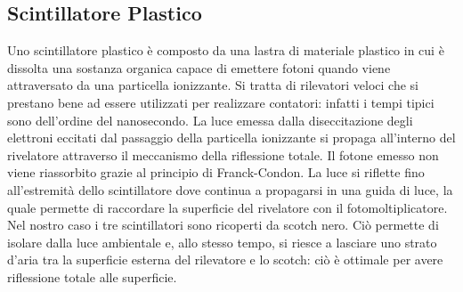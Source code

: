 \documentclass[a4paper,10pt]{article}
\begin{document}
\label{sec:apparato} 

\subsection{Scintillatore Plastico}
Uno scintillatore plastico è composto da una lastra di materiale plastico in cui è dissolta una sostanza organica capace di emettere fotoni quando viene attraversato da una particella ionizzante. Si tratta di rilevatori veloci che si prestano bene ad essere utilizzati per realizzare contatori: infatti i tempi tipici sono dell'ordine del nanosecondo. La luce emessa dalla diseccitazione degli elettroni eccitati dal passaggio della particella ionizzante si propaga all'interno del rivelatore attraverso il meccanismo della riflessione totale. Il fotone emesso non viene riassorbito grazie al principio di Franck-Condon. La luce si riflette fino all'estremità dello scintillatore dove continua a propagarsi in una guida di luce, la quale permette di raccordare la superficie del rivelatore con il fotomoltiplicatore. \\
Nel nostro caso i tre scintillatori sono ricoperti da scotch nero. Ciò permette di isolare dalla luce ambientale e, allo stesso tempo, si riesce a lasciare uno strato d'aria tra la superficie esterna del rilevatore e lo scotch: ciò è ottimale per avere riflessione totale alle superficie.
\end{document}
